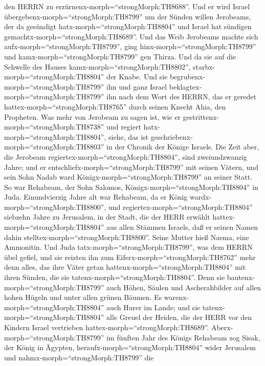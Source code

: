den HERRN zu erzürnenx-morph=``strongMorph:TH8688''.  Und
er wird Israel übergebenx-morph=``strongMorph:TH8799'' um der Sünden
willen Jerobeams, der da gesündigt hatx-morph=``strongMorph:TH8804'' und
Israel hat sündigen gemachtx-morph=``strongMorph:TH8689''. 
Und das Weib Jerobeams machte sich aufx-morph=``strongMorph:TH8799'',
ging hinx-morph=``strongMorph:TH8799'' und
kamx-morph=``strongMorph:TH8799'' gen Thirza. Und da sie auf die
Schwelle des Hauses kamx-morph=``strongMorph:TH8802'',
starbx-morph=``strongMorph:TH8804'' der Knabe.  Und sie
begrubenx-morph=``strongMorph:TH8799'' ihn und ganz Israel
beklagtex-morph=``strongMorph:TH8799'' ihn nach dem Wort des HERRN, das
er geredet hattex-morph=``strongMorph:TH8765'' durch seinen Knecht Ahia,
den Propheten.  Was mehr von Jerobeam zu sagen ist, wie er
gestrittenx-morph=``strongMorph:TH8738'' und regiert
hatx-morph=``strongMorph:TH8804'', siehe, das ist
geschriebenx-morph=``strongMorph:TH8803'' in der Chronik der Könige
Israels.  Die Zeit aber, die Jerobeam
regiertex-morph=``strongMorph:TH8804'', sind zweiundzwanzig Jahre; und
er entschliefx-morph=``strongMorph:TH8799'' mit seinen Vätern, und sein
Sohn Nadab ward Königx-morph=``strongMorph:TH8799'' an seiner Statt.
 So war Rehabeam, der Sohn Salomos,
Königx-morph=``strongMorph:TH8804'' in Juda. Einundvierzig Jahre alt war
Rehabeam, da er König wardx-morph=``strongMorph:TH8800'', und
regiertex-morph=``strongMorph:TH8804'' siebzehn Jahre zu Jerusalem, in
der Stadt, die der HERR erwählt hattex-morph=``strongMorph:TH8804'' aus
allen Stämmen Israels, daß er seinen Namen dahin
stelltex-morph=``strongMorph:TH8800''. Seine Mutter hieß Naema, eine
Ammonitin.  Und Juda tatx-morph=``strongMorph:TH8799'', was
dem HERRN übel gefiel, und sie reizten ihn zum
Eiferx-morph=``strongMorph:TH8762'' mehr denn alles, das ihre Väter
getan hattenx-morph=``strongMorph:TH8804'' mit ihren Sünden, die sie
tatenx-morph=``strongMorph:TH8804''.  Denn sie
bautenx-morph=``strongMorph:TH8799'' auch Höhen, Säulen und
Ascherahbilder auf allen hohen Hügeln und unter allen grünen Bäumen.
 Es warenx-morph=``strongMorph:TH8804'' auch Hurer im
Lande; und sie tatenx-morph=``strongMorph:TH8804'' alle Greuel der
Heiden, die der HERR vor den Kindern Israel vertrieben
hattex-morph=``strongMorph:TH8689''. 
Aberx-morph=``strongMorph:TH8799'' im fünften Jahr des Königs Rehabeam
zog Sisak, der König in Ägypten, heraufx-morph=``strongMorph:TH8804''
wider Jerusalem  und nahmx-morph=``strongMorph:TH8799'' die
